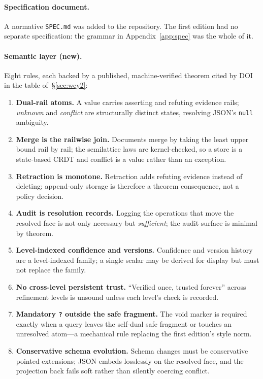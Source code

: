 \documentclass[11pt,a4paper]{article}
\begin{document}
\paragraph{Specification document.} A normative \texttt{SPEC.md} was added to
the repository. The first edition had no separate specification: the grammar in
Appendix~\ref{app:spec} was the whole of it.

\paragraph{Semantic layer (new).} Eight rules, each backed by a published,
machine-verified theorem cited by DOI in the table of~\S\ref{sec:wcy2}:

\begin{enumerate}[leftmargin=*,itemsep=2pt]
  \item \textbf{Dual-rail atoms.} A value carries asserting and refuting
        evidence rails; \emph{unknown} and \emph{conflict} are structurally
        distinct states, resolving JSON's \texttt{null} ambiguity.
  \item \textbf{Merge is the railwise join.} Documents merge by taking the
        least upper bound rail by rail; the semilattice laws are
        kernel-checked, so a store is a state-based CRDT and conflict is a
        value rather than an exception.
  \item \textbf{Retraction is monotone.} Retraction adds refuting evidence
        instead of deleting; append-only storage is therefore a theorem
        consequence, not a policy decision.
  \item \textbf{Audit is resolution records.} Logging the operations that move
        the resolved face is not only necessary but \emph{sufficient}; the
        audit surface is minimal by theorem.
  \item \textbf{Level-indexed confidence and versions.} Confidence and version
        history are a level-indexed family; a single scalar may be derived for
        display but must not replace the family.
  \item \textbf{No cross-level persistent trust.} ``Verified once, trusted
        forever'' across refinement levels is unsound unless each level's
        check is recorded.
  \item \textbf{Mandatory \texttt{?} outside the safe fragment.} The void
        marker is required exactly when a query leaves the self-dual safe
        fragment or touches an unresolved atom---a mechanical rule replacing
        the first edition's style norm.
  \item \textbf{Conservative schema evolution.} Schema changes must be
        conservative pointed extensions; JSON embeds losslessly on the
        resolved face, and the projection back fails soft rather than
        silently coercing conflict.
\end{enumerate}
\end{document}
